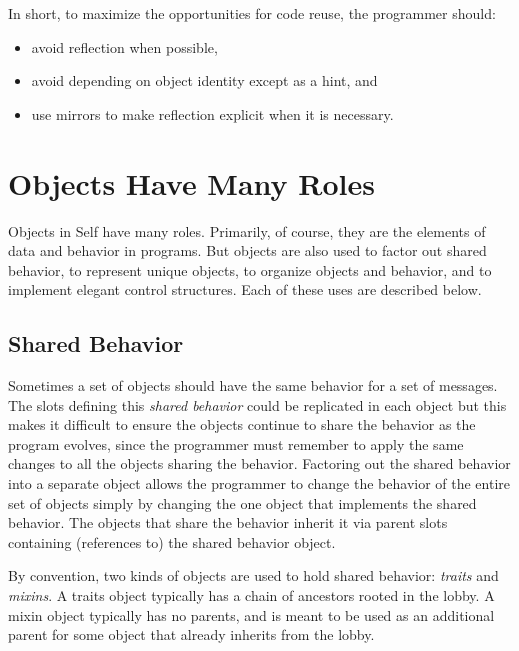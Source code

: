 \documentclass[letterpaper,10pt,english]{sphinxmanual}
\begin{document}
In short, to maximize the opportunities for code reuse, the programmer should:
\begin{itemize}
\item {} 
avoid reflection when possible,

\item {} 
avoid depending on object identity except as a hint, and

\item {} 
use mirrors to make reflection explicit when it is necessary.

\end{itemize}


\section{Objects Have Many Roles}
\label{progguid:objects-have-many-roles}
Objects in Self have many roles. Primarily, of course, they are the elements of data and behavior
in programs. But objects are also used to factor out shared behavior, to represent unique objects, to
organize objects and behavior, and to implement elegant control structures. Each of these uses are
described below.


\subsection{Shared Behavior}
\label{progguid:shared-behavior}
Sometimes a set of objects should have the same behavior for a set of messages. The slots defining
this \emph{shared behavior} could be replicated in each object but this makes it difficult to ensure the objects
continue to share the behavior as the program evolves, since the programmer must remember
to apply the same changes to all the objects sharing the behavior. Factoring out the shared behavior
into a separate object allows the programmer to change the behavior of the entire set of objects simply
by changing the one object that implements the shared behavior. The objects that share the
behavior inherit it via parent slots containing (references to) the shared behavior object.

By convention, two kinds of objects are used to hold shared behavior: \emph{traits} and \emph{mixins}. A traits
object typically has a chain of ancestors rooted in the lobby. A mixin object typically has no parents,
and is meant to be used as an additional parent for some object that already inherits from the
lobby.
\end{document}
